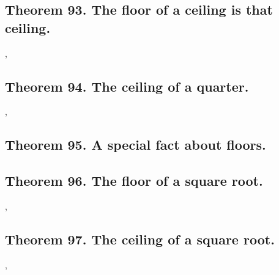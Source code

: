 \documentclass[preview]{standalone}
\begin{document}
\subsection[The floor of a ceiling is that ceiling.]
    {
        \color{section}Theorem 93. \color{black} The floor of a ceiling is that ceiling.
    }

\sep
\pagebreak


\subsection[The ceiling of a quarter.]
    {
        \color{section}Theorem 94. \color{black} The ceiling of a quarter.
    }

\sep
\pagebreak


\subsection[A special fact about floors.]
    {
        \color{section}Theorem 95. \color{black} A special fact about floors.
    }

\pagebreak


\subsection[The floor of a square root.]
    {
        \color{section}Theorem 96. \color{black} The floor of a square root.
    }

\sep
\pagebreak


\subsection[The ceiling of a square root.]
    {
        \color{section}Theorem 97. \color{black} The ceiling of a square root.
    }

\sep
\pagebreak


\end{document}
